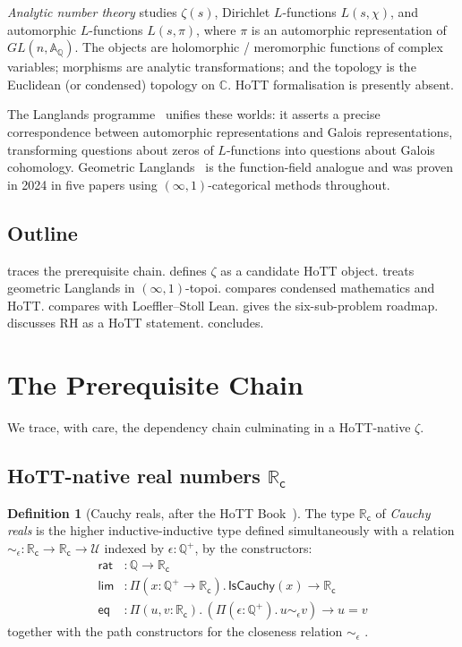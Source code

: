 \documentclass[12pt]{article}
\theoremstyle{definition}
\newtheorem{definition}[theorem]{Definition}
\theoremstyle{remark}
\newcommand{\C}{\mathbb{C}}
\newcommand{\R}{\mathbb{R}}
\newcommand{\Q}{\mathbb{Q}}
\newcommand{\Type}{\mathcal{U}}
\newcommand{\Rc}{\R_{\mathsf{c}}}
\begin{document}
\emph{Analytic number theory} studies $\zeta(s)$, Dirichlet $L$-functions
$L(s,\chi)$, and automorphic $L$-functions $L(s,\pi)$, where $\pi$ is an
automorphic representation of $GL(n,\mathbb{A}_\Q)$. The objects are
holomorphic / meromorphic functions of complex variables; morphisms are
analytic transformations; and the topology is the Euclidean (or condensed)
topology on $\C$. HoTT formalisation is presently absent.

The Langlands programme~\cite{Langlands1970,GelbartLanglands1979} unifies
these worlds: it asserts a precise correspondence between automorphic
representations and Galois representations, transforming questions about
zeros of $L$-functions into questions about Galois cohomology. Geometric
Langlands~\cite{Gaitsgory2024GLC} is the function-field analogue and was
proven in 2024 in five papers using $(\infty,1)$-categorical methods
throughout.

\subsection{Outline}

 traces the prerequisite chain.
 defines $\zeta$ as a candidate HoTT object.
 treats geometric Langlands in $(\infty,1)$-topoi.
 compares condensed mathematics and HoTT.
 compares with Loeffler--Stoll Lean.
 gives the six-sub-problem roadmap.
 discusses RH as a HoTT statement.
 concludes.

\section{The Prerequisite Chain}\label{sec:prereq}

We trace, with care, the dependency chain culminating in a HoTT-native $\zeta$.

\subsection{HoTT-native real numbers \texorpdfstring{$\Rc$}{Rc}}

\begin{definition}[Cauchy reals, after the HoTT Book~\cite{HoTTBook}]\label{def:Rc}
The type $\Rc$ of \emph{Cauchy reals} is the higher inductive-inductive type
defined simultaneously with a relation $\sim_\epsilon : \Rc \to \Rc \to \Type$
indexed by $\epsilon : \Q^+$, by the constructors:
\begin{align}
\mathsf{rat} &: \Q \to \Rc \\
\mathsf{lim} &: \Pi(x:\Q^+ \to \Rc).\, \mathsf{IsCauchy}(x) \to \Rc \\
\mathsf{eq} &: \Pi(u,v:\Rc).\, (\Pi(\epsilon:\Q^+).\, u \sim_\epsilon v) \to u = v
\end{align}
together with the path constructors for the closeness relation
$\sim_\epsilon$ \cite[Definition 11.3.2]{HoTTBook}.
\end{definition}
\end{document}
